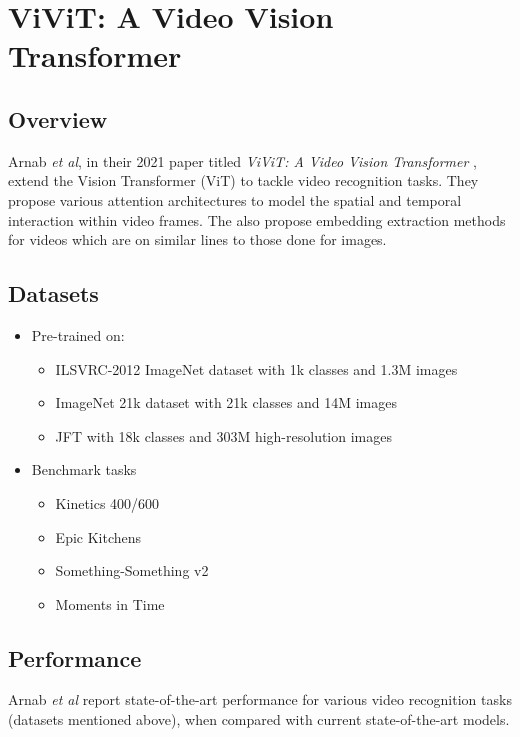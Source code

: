 \section{ViViT: A Video Vision Transformer} \label{appendix:vivit-paper}

\subsection{Overview}

\par Arnab \textit{et al}, in their 2021 paper titled \textit{ViViT: A Video Vision Transformer} \cite{vivit}, extend the Vision Transformer (ViT) \cite{vit} to tackle video recognition tasks. 
They propose various attention architectures to model the spatial and temporal interaction within video frames. 
The also propose embedding extraction methods for videos which are on similar lines to those done for images. \par

\subsection{Datasets}
\begin{itemize}
\item Pre-trained on:
	\begin{itemize}
		\item ILSVRC-2012 ImageNet dataset with 1k classes and 1.3M images
		\item ImageNet 21k dataset with 21k classes and 14M images 
		\item JFT with 18k classes and 303M high-resolution images
	\end{itemize}
\item Benchmark tasks
	\begin{itemize}
		\item Kinetics 400/600
		\item Epic Kitchens
		\item Something-Something v2
		\item Moments in Time
	\end{itemize}
\end{itemize}


\subsection{Performance}
\par Arnab \textit{et al} report state-of-the-art performance for various video recognition tasks (datasets mentioned above), when compared with current state-of-the-art models.\par


